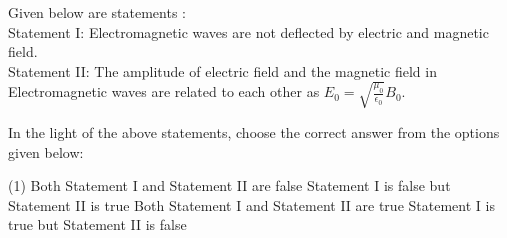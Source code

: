 \item Given below are statements : \\
Statement I: Electromagnetic waves are not deflected by electric and magnetic field. \\
Statement II: The amplitude of electric field and the magnetic field in \\
Electromagnetic waves are related to each other as $E_0 = \sqrt{\frac{\mu_0}{\epsilon_0}} B_0$.
        
In the light of the above statements, choose the correct answer from the options given below:
\begin{tasks}(1)
    \task Both Statement I and Statement II are false
    \task Statement I is false but Statement II is true
    \task Both Statement I and Statement II are true
    \task Statement I is true but Statement II is false
\end{tasks}